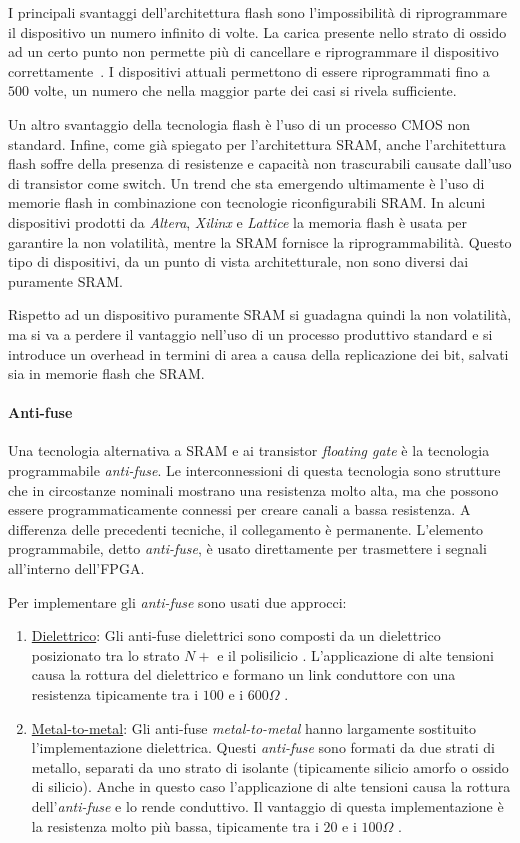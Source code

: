 I principali svantaggi dell'architettura flash sono l'impossibilità di riprogrammare il dispositivo un numero infinito di volte. La carica presente nello strato di ossido ad un certo punto non permette più di cancellare e riprogrammare il dispositivo correttamente~\cite{622505}. I dispositivi attuali permettono di essere riprogrammati fino a $500$ volte, un numero che nella maggior parte dei casi si rivela sufficiente.

Un altro svantaggio della tecnologia flash è l'uso di un processo CMOS non standard. Infine, come già spiegato per l'architettura SRAM, anche l'architettura flash soffre della presenza di resistenze e capacità non trascurabili causate dall'uso di transistor come switch. Un trend che sta emergendo ultimamente è l'uso di memorie flash in combinazione con tecnologie riconfigurabili SRAM. In alcuni dispositivi prodotti da \textit{Altera}, \textit{Xilinx} e \textit{Lattice} la memoria flash è usata per garantire la non volatilità, mentre la SRAM fornisce la riprogrammabilità. Questo tipo di dispositivi, da un punto di vista architetturale, non sono diversi dai puramente SRAM.

Rispetto ad un dispositivo puramente SRAM si guadagna quindi la non volatilità, ma si va a perdere il vantaggio nell'uso di un  processo produttivo standard e si introduce un overhead in termini di area a causa della replicazione dei bit, salvati sia in memorie flash che SRAM.

\paragraph{Anti-fuse}
Una tecnologia alternativa a SRAM e ai transistor \textit{floating gate} è la tecnologia programmabile \textit{anti-fuse}. Le interconnessioni di questa tecnologia sono strutture che in circostanze nominali mostrano una resistenza molto alta, ma che possono essere programmaticamente connessi per creare canali a bassa resistenza. A differenza delle precedenti tecniche, il collegamento è permanente. L'elemento programmabile, detto \textit{anti-fuse}, è usato direttamente per trasmettere i segnali all'interno dell'FPGA.

Per implementare gli \textit{anti-fuse} sono usati due approcci:
\begin{enumerate}
	\item \underline{Dielettrico}: Gli anti-fuse dielettrici sono composti da un dielettrico posizionato tra lo strato $N+$ e il polisilicio \cite{32929}. L'applicazione di alte tensioni causa la rottura del dielettrico e formano un link conduttore con una resistenza tipicamente tra i $100$ e i $600\Omega$ \cite{231343}.
	\item \underline{Metal-to-metal}: Gli anti-fuse \textit{metal-to-metal} hanno largamente sostituito l'implementazione dielettrica. Questi \textit{anti-fuse} sono formati da due strati di metallo, separati da uno strato di isolante (tipicamente silicio amorfo o ossido di silicio). Anche in questo caso l'applicazione di alte tensioni causa la rottura dell'\textit{anti-fuse} e lo rende conduttivo. Il vantaggio di questa implementazione è la resistenza molto più bassa, tipicamente tra i $20$ e i $100 \Omega$ \cite{584227}.
\end{enumerate}

